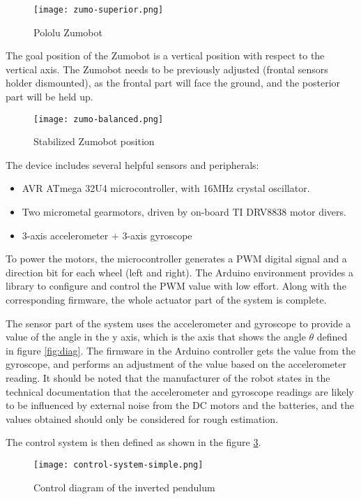 \begin{figure}[h]
	\centering
	\texttt{[image: zumo-superior.png]}
	\caption{Pololu Zumobot}\label{fig:zumo}
\end{figure}

The goal position of the Zumobot is a vertical position with respect to the vertical axis. The Zumobot needs to be previously adjusted (frontal sensors holder dismounted), as the frontal part will face the ground, and the posterior part will be held up.

\begin{figure}[h]
	\centering
	\texttt{[image: zumo-balanced.png]}
	\caption{Stabilized Zumobot position}\label{fig:zumoStable}
\end{figure}

The device includes several helpful sensors and peripherals:

\begin{itemize}
	\item AVR ATmega 32U4 microcontroller, with 16MHz crystal oscillator.
	\item Two micrometal gearmotors, driven by on-board TI DRV8838 motor divers.
	\item 3-axis accelerometer + 3-axis gyroscope
\end{itemize}

To power the motors, the microcontroller generates a PWM digital signal and a direction bit for each wheel (left and right). The Arduino environment provides a library to configure and control the PWM value with low effort. Along with the corresponding firmware, the whole actuator part of the system is complete.

The sensor part of the system uses the accelerometer and gyroscope to provide a value of the angle in the y axis, which is the axis that shows the angle $\theta$ defined in figure \ref{fig:diag}. The firmware in the Arduino controller gets the value from the gyroscope, and performs an adjustment of the value based on the accelerometer reading. It should be noted that the manufacturer of the robot states in the technical documentation\cite{POL01} that the accelerometer and gyroscope readings are likely to be influenced by external noise from the DC motors and the batteries, and the values obtained should only be considered for rough estimation.

The control system is then defined as shown in the figure \ref{fig:condiag}.

\begin{figure}[h]
	\centering
	\texttt{[image: control-system-simple.png]}
	\caption{Control diagram of the inverted pendulum}\label{fig:condiag}
\end{figure}

